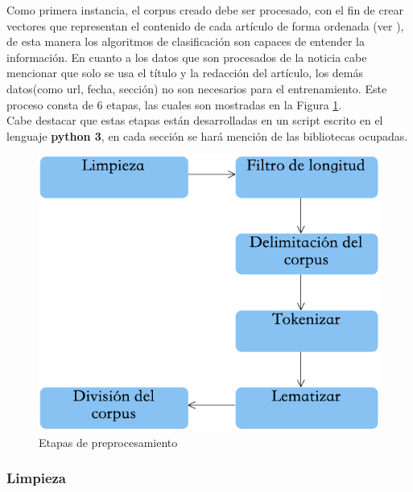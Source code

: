 Como primera instancia, el corpus creado debe ser procesado, con el fin de crear vectores que representan el contenido de cada artículo de forma ordenada (ver ), de esta manera los algoritmos de clasificación son capaces de entender la información. En cuanto a los datos que son procesados de la noticia cabe mencionar que solo se usa el título y la redacción del artículo, los demás datos(como url, fecha, sección) no son necesarios para el entrenamiento. Este proceso consta de 6 etapas, las cuales son mostradas en la Figura \ref{fig:cp5:preprocesamiento}. \\

Cabe destacar que estas etapas están desarrolladas en un script escrito en el lenguaje \textbf{python 3}, en cada sección se hará mención de las bibliotecas ocupadas.\\

\begin{figure}[h]
\centering
\includegraphics[scale=.55]{imagenes/capitulo5/Entrenamiento/preprocesamiento.png}
\caption{Etapas de preprocesamiento}
\label{fig:cp5:preprocesamiento}
\end{figure}

\subsubsection{Limpieza}

